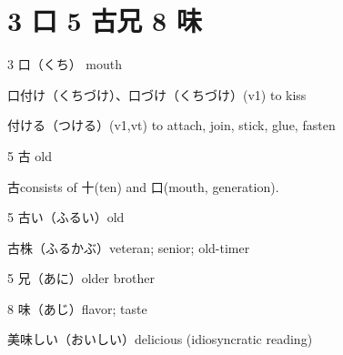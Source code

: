 \section{3 口 5 古兄 8 味}

3 口（くち） mouth

口付け（くちづけ）、口づけ（くちづけ）(v1) to kiss

付ける（つける）(v1,vt) to attach, join, stick, glue, fasten

5 古 old

古consists of 十(ten) and 口(mouth, generation).

5 古い（ふるい）old

古株（ふるかぶ）veteran; senior; old-timer

5 兄（あに）older brother

8 味（あじ）flavor; taste

美味しい（おいしい）delicious (idiosyncratic reading)

